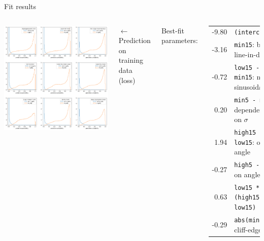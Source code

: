\documentclass[aspectratio=169]{beamer}
\begin{document}
\begin{frame}{Fit results}
\small
\vspace{0.25 cm}
\begin{columns}
\includegraphics[width=\linewidth]{img/fit-training-loss.png}

$\longleftarrow$ Prediction on training data (loss)

\vspace{0.5 cm}
Best-fit parameters:

\vspace{0.15 cm}
\begin{tabular}{r l}
-9.80 & \texttt{(intercept)} \\
-3.16 & \texttt{min15}: best line-in-disk \\
-0.72 & \texttt{low15 - min15}: non-sinusoidal \\
 0.20 & \texttt{min5 - min15}: dependence on $\sigma$ \\
 1.94 & \texttt{high15 - low15}: on angle \\
-0.27 & \texttt{high5 - low5}: on angle \\
 0.63 & \texttt{low15 * (high15 - low15)} \\
-0.29 & \texttt{abs(mindisk)}: cliff-edge veto \\
\end{tabular}


\end{columns}
\end{frame}
\end{document}
